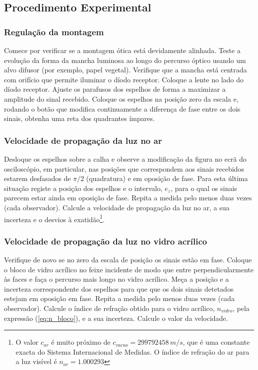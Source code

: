 \documentclass[a4paper,12pt]{article}      %
\begin{document}
\subsection{\sf Procedimento Experimental}
\subsubsection{\sf Regulação da montagem}
 
Comece por verificar se a montagem ótica está devidamente alinhada. Teste a evolução da forma da mancha 
luminosa ao longo do percurso óptico usando um alvo difusor (por exemplo, papel vegetal). 
Verifique que a mancha está centrada com  orifício que permite iluminar o 
díodo receptor. Coloque a lente no lado do díodo receptor.
Ajuste os parafusos dos espelhos de forma a maximizar a amplitude do sinal 
recebido.
Coloque os espelhos na posição zero da escala e, rodando o botão que modifica 
continuamente a diferença de fase entre os dois sinais, obtenha uma reta dos quadrantes ímpares. 

\subsubsection{\sf Velocidade de propagação da luz no ar}
Desloque os espelhos sobre a calha e observe a modificação da figura no ecrã do 
osciloscópio, em particular, nas posições que correspondem aos sinais recebidos estarem 
desfasados de $\pi/2$ (quadratura) e em oposição de fase. Para esta última situação registe a 
posição dos espelhos e o intervalo, $e_z$,  para o qual os sinais parecem estar ainda em 
oposição de fase. Repita a medida pelo menos duas vezes (cada observador). 
Calcule a velocidade de propagação da luz no ar, a sua incerteza e o desvios à exatidão\footnote{O valor $c_{ar}$ é muito próximo de $c_{vacuo} = 299 792 458\,m/s$, que é uma constante exacta do Sistema Internacional de Medidas. O índice de refração do ar para a luz visível é $n_{ar}=1.000293$}. 

\subsubsection{\sf Velocidade de propagação da luz no vidro acrílico}
Verifique de novo se no zero da escala de posição os sinais estão em fase. Coloque o bloco de vidro 
acrílico no feixe incidente de modo que entre perpendicularmente às faces e faça o percurso 
mais longo no vidro acrílico. Meça a posição e a incerteza correspondente dos espelhos para que 
que os dois sinais detetados estejam em oposição em fase. Repita a medida pelo menos 
duas vezes (cada observador).
Calcule o índice de refração obtido para o vidro acrílico, $n_{vidro}$, pela expressão (\ref{eq:n_bloco}),  e a sua incerteza. Calcule o valor da velocidade.
\end{document}
